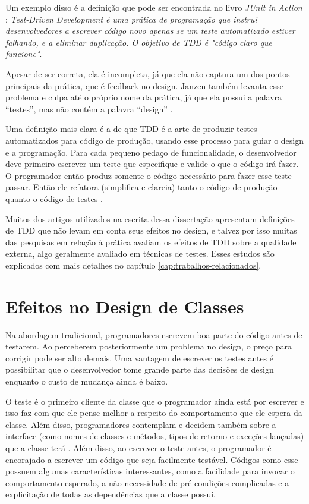 Um exemplo disso é a definição que pode ser encontrada no livro \textit{JUnit
in Action} \cite{junit-in-action}: \textit{Test-Driven Development é uma
prática de programação que instrui desenvolvedores a escrever código novo
apenas se um teste automatizado estiver falhando, e a eliminar duplicação. O
objetivo de TDD é "código claro que funcione"}.

Apesar de ser correta, ela é incompleta, já que ela não captura um dos pontos
principais da prática, que é feedback no design. Janzen também levanta esse
problema e culpa até o próprio nome da prática, já que ela possui a palavra
``testes'', mas não contém a palavra ``design'' \cite{tdd-really-improve}.

Uma definição mais clara é a de que TDD é a arte de produzir testes
automatizados para código de produção, usando esse processo para guiar o design e a programação.
Para cada pequeno pedaço de funcionalidade, o desenvolvedor deve primeiro
escrever um teste que especifique e valide o que o código irá fazer. O
programador então produz somente o código necessário para fazer esse teste
passar. Então ele refatora (simplifica e clareia) tanto o código de produção
quanto o código de testes \cite{agilealliance-tdd} \cite{tdd-taxonomy}.

Muitos dos artigos utilizados na escrita dessa dissertação apresentam definições
de TDD que não levam em conta seus efeitos no design, e talvez por isso muitas das 
pesquisas em relação à prática avaliam os efeitos de TDD sobre a qualidade 
externa, algo geralmente avaliado em técnicas de testes. Esses estudos são 
explicados com mais detalhes no capítulo \ref{cap:trabalhos-relacionados}.

\section{Efeitos no Design de Classes}

Na abordagem tradicional, programadores escrevem boa parte do código antes de
testarem. Ao perceberem posteriormente um problema no design, o preço para
corrigir pode ser alto demais. Uma vantagem de escrever os testes antes é
possibilitar que o desenvolvedor tome grande parte das decisões de design
enquanto o custo de mudança ainda é baixo.

O teste é o primeiro cliente da
classe que o programador ainda está por escrever e isso faz com que ele pense
melhor a respeito do comportamento que ele espera da classe. Além disso,
programadores contemplam e decidem também sobre a interface (como nomes de
classes e métodos, tipos de retorno e exceções lançadas) que a classe terá
\cite{janzen-saiedian}.
Além disso, ao escrever o teste antes, o programador é encorajado a escrever um
código que seja facilmente testável. Códigos como esse possuem algumas
características interessantes, como a facilidade para invocar o comportamento
esperado, a não necessidade de pré-condições complicadas e a explicitação de
todas as dependências que a classe possui.

